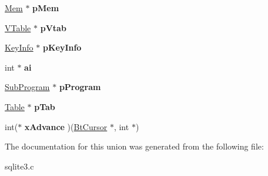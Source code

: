 \begin{DoxyCompactItemize}
\item 
\hyperlink{structMem}{Mem} $\ast$ {\bfseries p\+Mem}\hypertarget{unionVdbeOp_1_1p4union_a52d756a2ccc11e5e87703e6f8129261c}{}\label{unionVdbeOp_1_1p4union_a52d756a2ccc11e5e87703e6f8129261c}

\item 
\hyperlink{structVTable}{V\+Table} $\ast$ {\bfseries p\+Vtab}\hypertarget{unionVdbeOp_1_1p4union_a25abd8bcf2df2f591e2dc6c377f8f427}{}\label{unionVdbeOp_1_1p4union_a25abd8bcf2df2f591e2dc6c377f8f427}

\item 
\hyperlink{structKeyInfo}{Key\+Info} $\ast$ {\bfseries p\+Key\+Info}\hypertarget{unionVdbeOp_1_1p4union_acda5935a8938d01e523d0eb79b0c1e72}{}\label{unionVdbeOp_1_1p4union_acda5935a8938d01e523d0eb79b0c1e72}

\item 
int $\ast$ {\bfseries ai}\hypertarget{unionVdbeOp_1_1p4union_a1bd30fbce8b173d7270d04dc714863f3}{}\label{unionVdbeOp_1_1p4union_a1bd30fbce8b173d7270d04dc714863f3}

\item 
\hyperlink{structSubProgram}{Sub\+Program} $\ast$ {\bfseries p\+Program}\hypertarget{unionVdbeOp_1_1p4union_ac72a98a54ea6ddd7b168af47fab46a41}{}\label{unionVdbeOp_1_1p4union_ac72a98a54ea6ddd7b168af47fab46a41}

\item 
\hyperlink{structTable}{Table} $\ast$ {\bfseries p\+Tab}\hypertarget{unionVdbeOp_1_1p4union_af846307afcc87ba2ca357108d3c48edf}{}\label{unionVdbeOp_1_1p4union_af846307afcc87ba2ca357108d3c48edf}

\item 
int($\ast$ {\bfseries x\+Advance} )(\hyperlink{structBtCursor}{Bt\+Cursor} $\ast$, int $\ast$)\hypertarget{unionVdbeOp_1_1p4union_abede37475ebf4b3c05a43cef11281f4e}{}\label{unionVdbeOp_1_1p4union_abede37475ebf4b3c05a43cef11281f4e}

\end{DoxyCompactItemize}


The documentation for this union was generated from the following file\+:\begin{DoxyCompactItemize}
\item 
sqlite3.\+c\end{DoxyCompactItemize}
